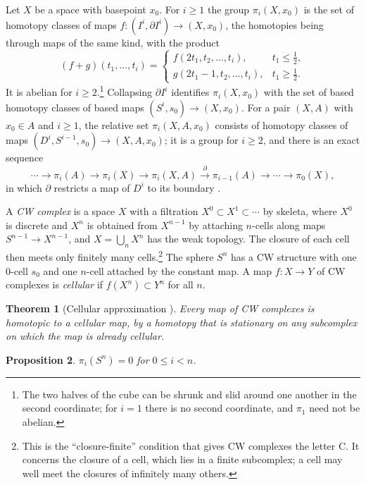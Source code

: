 \documentclass[11pt]{amsart}
\numberwithin{equation}{section}
\theoremstyle{plain}
\newtheorem{theorem}{Theorem}[section]
\newtheorem{proposition}[theorem]{Proposition}
\theoremstyle{definition}
\theoremstyle{remark}
\begin{document}
Let $X$ be a space with basepoint $x_0$. For $i\ge1$ the group $\pi_i(X,x_0)$ is the set of homotopy classes of maps $f\colon(I^i,\partial I^i)\to(X,x_0)$, the homotopies being through maps of the same kind, with the product
\[
(f+g)(t_1,\dots,t_i)=\begin{cases}f(2t_1,t_2,\dots,t_i),&t_1\le\tfrac12,\\ g(2t_1-1,t_2,\dots,t_i),&t_1\ge\tfrac12.\end{cases}
\]
It is abelian for $i\ge2$.\footnote{The two halves of the cube can be shrunk and slid around one another in the second coordinate; for $i=1$ there is no second coordinate, and $\pi_1$ need not be abelian.} Collapsing $\partial I^i$ identifies $\pi_i(X,x_0)$ with the set of based homotopy classes of based maps $(S^i,s_0)\to(X,x_0)$. For a pair $(X,A)$ with $x_0\in A$ and $i\ge1$, the relative set $\pi_i(X,A,x_0)$ consists of homotopy classes of maps $(D^i,S^{i-1},s_0)\to(X,A,x_0)$; it is a group for $i\ge2$, and there is an exact sequence
\begin{equation}\label{eq:pair-les}
\cdots\to\pi_i(A)\to\pi_i(X)\to\pi_i(X,A)\xrightarrow{\ \partial\ }\pi_{i-1}(A)\to\cdots\to\pi_0(X),
\end{equation}
in which $\partial$ restricts a map of $D^i$ to its boundary \cite[Theorem~4.3]{Hat02}.

A \emph{CW complex} is a space $X$ with a filtration $X^0\subset X^1\subset\cdots$ by skeleta, where $X^0$ is discrete and $X^n$ is obtained from $X^{n-1}$ by attaching $n$-cells along maps $S^{n-1}\to X^{n-1}$, and $X=\bigcup_nX^n$ has the weak topology. The closure of each cell then meets only finitely many cells.\footnote{This is the ``closure-finite'' condition that gives CW complexes the letter C. It concerns the closure of a cell, which lies in a finite subcomplex; a cell may well meet the closures of infinitely many others.} The sphere $S^n$ has a CW structure with one $0$-cell $s_0$ and one $n$-cell attached by the constant map. A map $f\colon X\to Y$ of CW complexes is \emph{cellular} if $f(X^n)\subset Y^n$ for all $n$.

\begin{theorem}[Cellular approximation {\cite[Theorem~4.8]{Hat02}}]\label{thm:cellular}
Every map of CW complexes is homotopic to a cellular map, by a homotopy that is stationary on any subcomplex on which the map is already cellular.
\end{theorem}

\begin{proposition}\label{prop:below}
$\pi_i(S^n)=0$ for $0\le i<n$.
\end{proposition}
\end{document}
